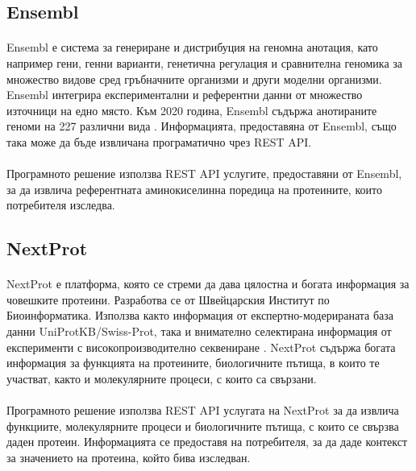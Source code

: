 \documentclass[pdftex,cyrillic,14pt,a4page,twoside,openright]{extreport}
\begin{document}
\subsection{Ensembl}\label{sec:ensembl}
\paragraph{}
Ensembl е система за генериране и дистрибуция на геномна анотация, като например гени, генни варианти, генетична регулация и сравнителна геномика за множество видове сред гръбначните организми и други моделни организми. Ensembl интегрира експериментални и референтни данни от множество източници на едно място. Към 2020 година, Ensembl съдържа анотираните геноми на 227 различни вида \cite{yates2020}. Информацията, предоставяна от Ensembl, също така може да бъде извличана програматично чрез REST API.

\paragraph{}
Програмното решение използва REST API услугите, предоставяни от Ensembl, за да извлича референтната аминокиселинна поредица на протеините, които потребителя изследва.

\subsection{NextProt}\label{sec:nextprot}
\paragraph{}
NextProt е платформа, която се стреми да дава цялостна и богата информация за човешките протеини. Разработва се от Швейцарския Институт по Биоинформатика. Използва както информация от експертно-модерираната база данни UniProtKB/Swiss-Prot, така и внимателно селектирана информация от експерименти с високопроизводително секвениране \cite{lane2011}. NextProt съдържа богата информация за функцията на протеините, биологичните пътища, в които те участват, както и молекулярните процеси, с които са свързани.

\paragraph{}
Програмното решение използва REST API услугата на NextProt за да извлича функциите, молекулярните процеси и биологичните пътища, с които се свързва даден протеин. Информацията се предоставя на потребителя, за да даде контекст за значението на протеина, който бива изследван.
\end{document}
